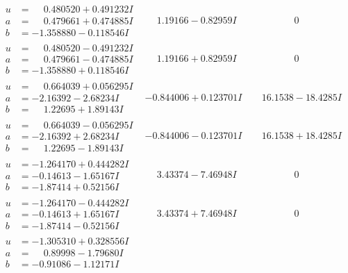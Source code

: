 \documentclass[1p]{elsarticle_modified}
\theoremstyle{definition}
\begin{document}
$$\begin{array}{c|c|c}
\begin{aligned}
u &= \phantom{-}0.480520 + 0.491232 I \\
a &= \phantom{-}0.479661 + 0.474885 I \\
b &= -1.358880 - 0.118546 I\end{aligned}
 & \phantom{-}1.19166 - 0.82959 I & \phantom{-0.000000 } 0 \\ \hline\begin{aligned}
u &= \phantom{-}0.480520 - 0.491232 I \\
a &= \phantom{-}0.479661 - 0.474885 I \\
b &= -1.358880 + 0.118546 I\end{aligned}
 & \phantom{-}1.19166 + 0.82959 I & \phantom{-0.000000 } 0 \\ \hline\begin{aligned}
u &= \phantom{-}0.664039 + 0.056295 I \\
a &= -2.16392 - 2.68234 I \\
b &= \phantom{-}1.22695 + 1.89143 I\end{aligned}
 & -0.844006 + 0.123701 I & \phantom{-}16.1538 - 18.4285 I \\ \hline\begin{aligned}
u &= \phantom{-}0.664039 - 0.056295 I \\
a &= -2.16392 + 2.68234 I \\
b &= \phantom{-}1.22695 - 1.89143 I\end{aligned}
 & -0.844006 - 0.123701 I & \phantom{-}16.1538 + 18.4285 I \\ \hline\begin{aligned}
u &= -1.264170 + 0.444282 I \\
a &= -0.14613 - 1.65167 I \\
b &= -1.87414 + 0.52156 I\end{aligned}
 & \phantom{-}3.43374 - 7.46948 I & \phantom{-0.000000 } 0 \\ \hline\begin{aligned}
u &= -1.264170 - 0.444282 I \\
a &= -0.14613 + 1.65167 I \\
b &= -1.87414 - 0.52156 I\end{aligned}
 & \phantom{-}3.43374 + 7.46948 I & \phantom{-0.000000 } 0 \\ \hline\begin{aligned}
u &= -1.305310 + 0.328556 I \\
a &= \phantom{-}0.89998 - 1.79680 I \\
b &= -0.91086 - 1.12171 I\end{aligned}

\end{array}$$
\end{document}
